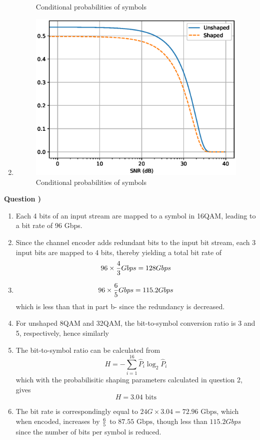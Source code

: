 \documentclass[10pt,letterpaper]{article}
\newcounter{QuestionNumber}
\newcommand{\Q}{
\textbf{Question \theQuestionNumber)}
\stepcounter{QuestionNumber}
}
\begin{document}
\begin{enumerate}[label=\alph*-]
\begin{figure}[h]
\caption{Conditional probabilities of symbols}
\end{figure}
\item
\begin{figure}[h]
\centering
\includegraphics[width=120mm]{p_error_total}
\caption{Conditional probabilities of symbols}
\end{figure}
\end{enumerate}

\Q

\begin{enumerate}[label=\alph*-]
\item
Each 4 bits of an input stream are mapped to a symbol in 16QAM, leading to a bit rate of 96 Gbps.
\item
Since the channel encoder adds redundant bits to the input bit stream, each 3 input bits are mapped to 4 bits, thereby yielding a total bit rate of
$$
96\times {4\over 3} Gbps=128 Gbps
$$
\item
$$
96\times {6\over 5} Gbps=115.2 Gbps
$$
which is less than that in part b- since the redundancy is decreased.
\item
For unshaped 8QAM and 32QAM, the bit-to-symbol conversion ratio is 3 and 5, respectively, hence
similarly
\item
The bit-to-symbol ratio can be calculated from 
$$
H=-\sum_{i=1}^{16} \hat P_i\log_2 \hat P_i
$$
which with the probabilisitic shaping parameters calculated in question 2, gives 
$$
H=3.04 \text{ bits}
$$
\item
The bit rate is correspondingly equal to $24 G\times 3.04=72.96 \text{ Gbps}$, which when encoded, increases by ${6\over 5}$ to $87.55\text{ Gbps}$, though less than $115.2 Gbps$ since the number of bits per symbol is reduced.
\end{enumerate}
\end{document}
